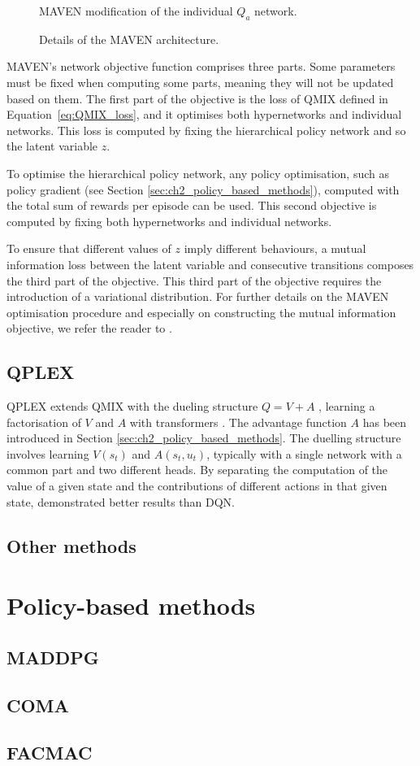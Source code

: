 \begin{figure}
\centering

\caption{MAVEN modification of the individual $Q_a$ network.}
\label{fig:maven}
\caption{Details of the MAVEN architecture.}
\end{figure}

MAVEN's network objective function comprises three parts.
Some parameters must be fixed when computing some parts, meaning they will not be updated based on them.
The first part of the objective is the loss of QMIX defined in Equation~\ref{eq:QMIX_loss}, and it optimises both hypernetworks and individual networks.
This loss is computed by fixing the hierarchical policy network and so the latent variable $z$.

To optimise the hierarchical policy network, any policy optimisation, such as policy gradient (see Section \ref{sec:ch2_policy_based_methods}), computed with the total sum of rewards per episode can be used.
This second objective is computed by fixing both hypernetworks and individual networks.

To ensure that different values of $z$ imply different behaviours, a mutual information loss between the latent variable and consecutive transitions composes the third part of the objective.
This third part of the objective requires the introduction of a variational distribution.
For further details on the MAVEN optimisation procedure and especially on constructing the mutual information objective, we refer the reader to \cite{Mahajan2019MAVEN:Exploration}.

\subsection{QPLEX}
QPLEX \citep{wang2021qplex} extends QMIX with the dueling structure $Q = V + A$ \citep{wang2016dueling}, learning a factorisation of $V$ and $A$ with transformers \citep{vaswani2017attention}.
The advantage function $A$ has been introduced in Section \ref{sec:ch2_policy_based_methods}.
The duelling structure involves learning $V(s_t)$ and $A(s_t, u_t)$, typically with a single network with a common part and two different heads.
By separating the computation of the value of a given state and the contributions of different actions in that given state, \citet{wang2016dueling} demonstrated better results than DQN.



\subsection{Other methods}
\section{Policy-based methods}
\label{sec:ch3_policy}
\subsection{MADDPG}
\subsection{COMA}
\subsection{FACMAC}


